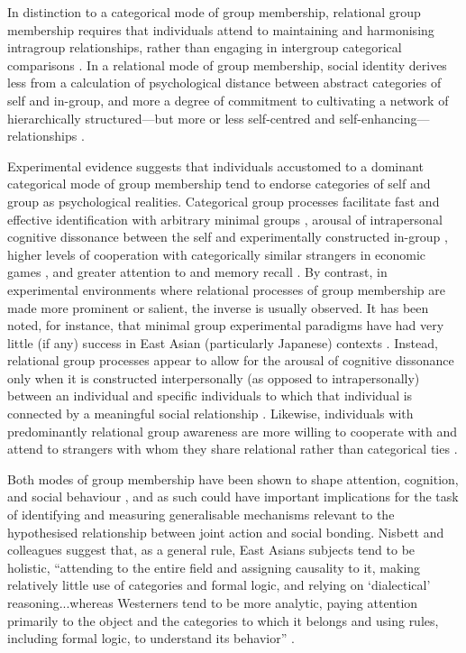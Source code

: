 \begin{CJK}{UTF8}{gbsn}
In distinction to a categorical mode of group membership, relational group membership requires that individuals attend to maintaining and harmonising intragroup relationships, rather than engaging in intergroup categorical comparisons \citep{Yuki2003}.  In a relational mode of group membership, social identity derives less from a calculation of psychological distance between abstract categories of self and in-group, and more a degree of commitment to cultivating a network of hierarchically structured---but more or less self-centred and self-enhancing---relationships \citep{Liu2009,Nisbett2003}.

Experimental evidence suggests that individuals accustomed to a dominant categorical mode of group membership tend to endorse categories of self and group as psychological realities.  Categorical group processes facilitate fast and effective identification with arbitrary minimal groups \citep{Diehl1990,VanBavel2014}, arousal of intrapersonal cognitive dissonance between the self and experimentally constructed in-group \citep{Festinger1957, Stone2001}, higher levels of cooperation with categorically similar strangers in economic games \citep{Yuki2005,Yuki2003}, and greater attention to and memory recall \citep{Buchan2006,Ng2016}.  By contrast, in experimental environments where relational processes of group membership are made more prominent or salient, the inverse is usually observed.  It has been noted, for instance, that minimal group experimental paradigms have had very little (if any) success in East Asian (particularly Japanese) contexts \citep[586]{Liu2009}.  Instead, relational group processes appear to allow for the arousal of cognitive dissonance only when it is constructed interpersonally (as opposed to intrapersonally) between an individual and specific individuals to which that individual is connected by a meaningful social relationship \citep{Hoshino-Browne2005}.  Likewise, individuals with predominantly relational group awareness are more willing to cooperate with and attend to strangers with whom they share relational rather than categorical ties \citep{Ng2016,Yuki2005}.

Both modes of group membership have been shown to shape attention, cognition, and social behaviour \citep{Nisbett2003}, and as such could have important implications for the task of identifying and measuring generalisable mechanisms relevant to the hypothesised relationship between joint action and social bonding.  Nisbett and colleagues suggest that, as a general rule, East Asians subjects tend to be holistic, ``attending to the entire field and assigning causality to it, making relatively little use of categories and formal logic, and relying on ‘dialectical’ reasoning...whereas Westerners tend to be more analytic, paying attention primarily to the object and the categories to which it belongs and using rules, including formal logic, to understand its behavior'' \citep[291]{Nisbett2001}.


\end{CJK}

